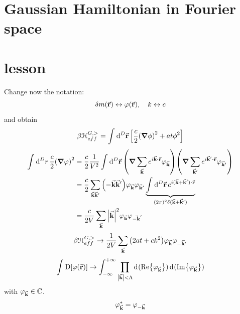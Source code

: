 \documentclass[../main/main.tex]{subfiles}
\begin{document}
\section{Gaussian Hamiltonian in Fourier space}




\section{lesson}




Change now the notation:
\begin{equation}
  \delta m (\va{r}) \leftrightarrow \varphi (\va{r}), \quad k \leftrightarrow c
\end{equation}
and obtain
\begin{equation}
  \beta \mathcal{H}_{eff}^{G,>} = \int_{}^{} \dd[D]{\va{r}} \qty[\frac{c}{2} \qty(\grad \phi )^2 + a t \phi ^2 ]
\end{equation}
\begin{equation}
\begin{split}
  \int_{}^{} \dd[D]{r} \frac{c}{2} \qty(\grad \varphi )^2 & = \frac{c}{2} \frac{1}{V^2} \int_{}^{} \dd[D]{\va{r}} \qty(\grad \sum_{\va{k}}^{} e^{i \va{k} \vdot \va{r}} \varphi _{\va{k}}  ) \qty(\grad \sum_{\va{k}'}^{} e^{i \va{k}' \vdot \va{r} } \varphi _{\va{k}'}  )     \\
  & = \frac{c}{2} \sum_{\va{k} \va{k}'}^{}  \qty(- \va{k} \va{k}') \varphi _{\va{k}} \varphi _{\va{k}'} \underbrace{\int_{}^{} \dd[D]{\va{r}}  e^{i (\va{k}+\va{k}')\vdot \va{r}}}_{(2 \pi )^2 \delta (\va{k}+ \va{k}')}   \\
  & = \frac{c}{2V} \sum_{\va{k}}^{} \abs{\va{k}}^2 \varphi _{\va{k}} \varphi _{\va{-k}'}
\end{split}
\end{equation}
\begin{equation}
  \beta \mathcal{H}_{eff}^{G,>} \rightarrow \frac{1}{2V} \sum_{\va{k}}^{} \qty(2 a t + c k^2) \varphi _{\va{k}} \varphi _{-\va{k}'}
\end{equation}
\begin{equation}
  \int_{}^{} \text{D} \qty[\varphi (\va{r})] \rightarrow \int_{- \infty }^{+ \infty } \prod_{\abs{\va{k}} < \Lambda  }^{}   \dd[]{(\Re{\varphi _{\va{k}}})}   \dd[]{(\Im{\varphi _{\va{k}}})}
\end{equation}
with \( \varphi _{\va{k}} \in \mathbb{C} \).
\begin{equation}
  \varphi _{\va{k}}^* = \varphi _{-\va{k}}
\end{equation}
\end{document}
